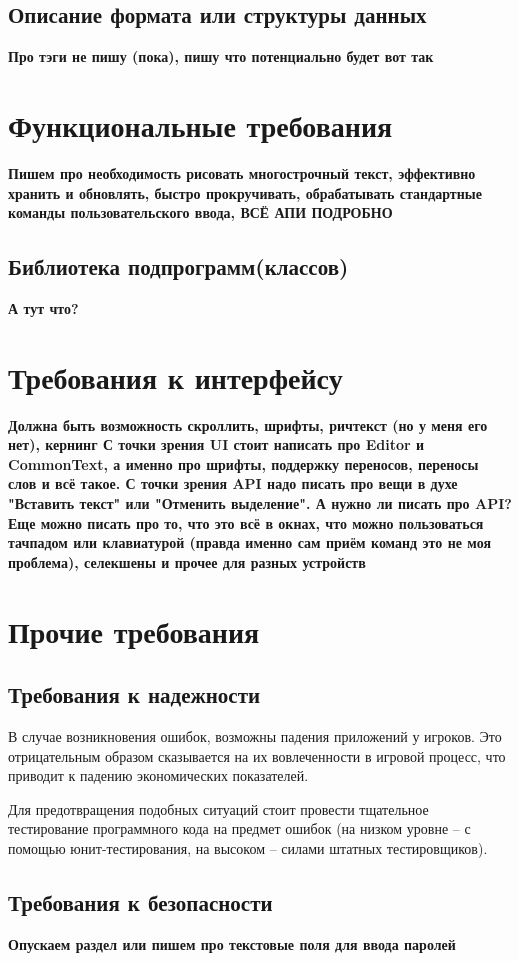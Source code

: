 \documentclass{fefu}
\begin{document}
		\subsection{Описание формата или структуры данных}
			\textbf{Про тэги не пишу (пока), пишу что потенциально будет вот так}
	\section{Функциональные требования}
		\par\textbf{Пишем про необходимость рисовать многострочный текст, эффективно хранить
		и обновлять, быстро прокручивать, обрабатывать стандартные команды пользовательского
		ввода, ВСЁ АПИ ПОДРОБНО }
		\subsection{Библиотека подпрограмм(классов)}
			\textbf{А тут что?}
	\section{Требования к интерфейсу}
		\textbf{Должна быть возможность скроллить, шрифты, ричтекст (но у меня его нет), кернинг
		С точки зрения UI стоит написать про Editor и CommonText, а именно про 
		шрифты, поддержку переносов, переносы слов и всё такое. С точки зрения API надо писать
		про вещи в духе "Вставить текст" или "Отменить выделение". А нужно ли писать про API?
		Еще можно писать про то, что это всё в окнах, что можно пользоваться тачпадом или 
		клавиатурой (правда именно сам приём команд это не моя проблема), селекшены и прочее 
		для разных устройств}
	\section{Прочие требования}
		\subsection{Требования к надежности}
			\par В случае возникновения ошибок, возможны падения приложений у игроков. Это 
			отрицательным образом сказывается на их вовлеченности в игровой процесс, что
			приводит к падению экономических показателей.
			\par Для предотвращения подобных ситуаций стоит провести тщательное тестирование
			программного кода на предмет ошибок (на низком уровне -- с помощью 
			юнит-тестирования, на высоком -- силами штатных тестировщиков).
		\subsection{Требования к безопасности}
			\textbf{Опускаем раздел или пишем про текстовые поля для ввода паролей}
\end{document}
